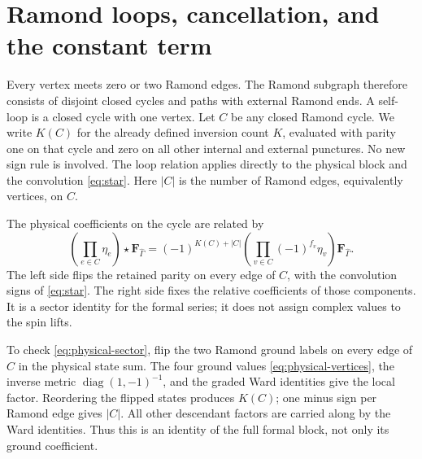 \documentclass[11pt]{article}
\numberwithin{equation}{section}
\begin{document}
\section{Ramond loops, cancellation, and the constant term}

Every vertex meets zero or two Ramond edges. The Ramond subgraph therefore
consists of disjoint closed cycles and paths with external Ramond ends.
A self-loop is a closed cycle with one vertex. Let $C$ be any closed
Ramond cycle. We write $K(C)$ for the already defined inversion count
$K$, evaluated with parity one on that cycle and zero on all other
internal and external punctures. No new sign rule is involved.
The loop relation applies directly to the physical block and the
convolution \eqref{eq:star}. Here $|C|$ is the number of Ramond edges,
equivalently vertices, on $C$.

The physical coefficients on the cycle are related by
\begin{equation}
 \left(\prod_{e\in C}\eta_e\right)
   \star\mathbf F_{\hat\Gamma}
 =(-1)^{K(C)+|C|}
     \left(\prod_{v\in C}(-1)^{f_v}\eta_v\right)
          \mathbf F_{\hat\Gamma}.
 \label{eq:physical-sector}
\end{equation}
The left side flips the retained parity on every edge of $C$, with the
convolution signs of \eqref{eq:star}. The right side fixes the relative
coefficients of those components. It is a sector identity for the formal
series; it does not assign complex values to the spin lifts.

To check \eqref{eq:physical-sector}, flip the two Ramond ground
labels on every edge of $C$ in the physical state sum. The four
ground values \eqref{eq:physical-vertices}, the inverse metric
$\operatorname{diag}(1,-1)^{-1}$, and the graded Ward identities give
the local factor. Reordering the flipped states produces $K(C)$;
one minus sign per Ramond edge gives $|C|$. All other descendant
factors are carried along by the Ward identities. Thus this is an
identity of the full formal block, not only its ground coefficient.
\end{document}
